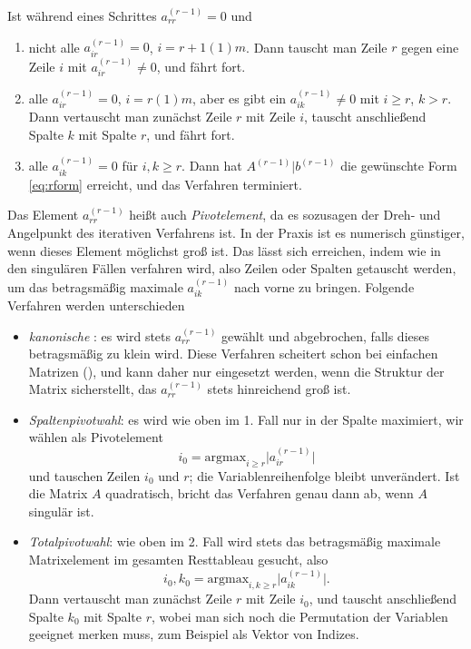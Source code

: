 Ist während eines Schrittes $a_{rr}^{(r-1)} = 0$ und
\begin{enumerate}
\item nicht alle $a_{ir}^{(r-1)}=0$, $i=r+1(1)m$. Dann tauscht man
  Zeile $r$ gegen eine Zeile $i$ mit $a_{ir}^{(r-1)}\neq 0$, und fährt
  fort.
\item alle $a_{ir}^{(r-1)}=0$, $i=r(1)m$, aber es gibt ein
  $a_{ik}^{(r-1)}\neq 0$ mit $i\ge r$, $k> r$. Dann vertauscht man zunächst
  Zeile $r$ mit Zeile $i$, tauscht anschließend Spalte $k$ mit
  Spalte $r$, und fährt fort.
\item alle $a_{ik}^{(r-1)}=0$ für $i,k \ge r$. Dann hat
  $A^{(r-1)}|b^{(r-1)}$ die gewünschte Form \eqref{eq:rform} erreicht,
  und das Verfahren terminiert.
\end{enumerate}

Das Element $a_{rr}^{(r-1)}$ heißt auch \emph{Pivotelement}, da es
sozusagen der Dreh- und Angelpunkt des iterativen Verfahrens ist.  In
der Praxis ist es numerisch günstiger, wenn dieses Element möglichst
groß ist. Das lässt sich erreichen, indem wie in den singulären
Fällen verfahren wird, also Zeilen oder Spalten getauscht werden, um
das betragsmäßig maximale $a_{ik}^{(r-1)}$ nach vorne zu
bringen. Folgende Verfahren werden unterschieden
\begin{itemize}
\item \emph{kanonische }: es wird stets
  $a_{rr}^{(r-1)}$ gewählt und abgebrochen, falls dieses betragsmäßig
  zu klein wird. Diese Verfahren scheitert schon bei einfachen
  Matrizen (), und kann daher nur eingesetzt werden, wenn
  die Struktur der Matrix sicherstellt, das $a_{rr}^{(r-1)}$ stets
  hinreichend groß ist.
\item \emph{Spaltenpivotwahl}: es wird wie oben im 1. Fall nur in der
  Spalte maximiert, \dh wir wählen als  Pivotelement
  \begin{equation}
    i_0 = \text{argmax}_{i\ge r} \lvert a_{ir}^{(r-1)}\rvert
  \end{equation}
  und tauschen Zeilen $i_0$ und $r$; die Variablenreihenfolge bleibt
  unverändert. Ist die Matrix $A$ quadratisch, bricht das Verfahren
  genau dann ab, wenn $A$ singulär ist.
\item \emph{Totalpivotwahl}: wie oben im 2. Fall wird stets das
  betragsmäßig maximale
  Matrixelement im gesamten Resttableau gesucht, also
  \begin{equation}
    i_0,k_0 = \text{argmax}_{i,k\ge r} \lvert a_{ik}^{(r-1)}\rvert.
  \end{equation}
  Dann vertauscht man zunächst Zeile $r$ mit Zeile $i_0$, und tauscht
  anschließend Spalte $k_0$ mit Spalte $r$, wobei man sich noch die
  Permutation der Variablen geeignet merken muss, zum Beispiel als
  Vektor von Indizes.
\end{itemize}

